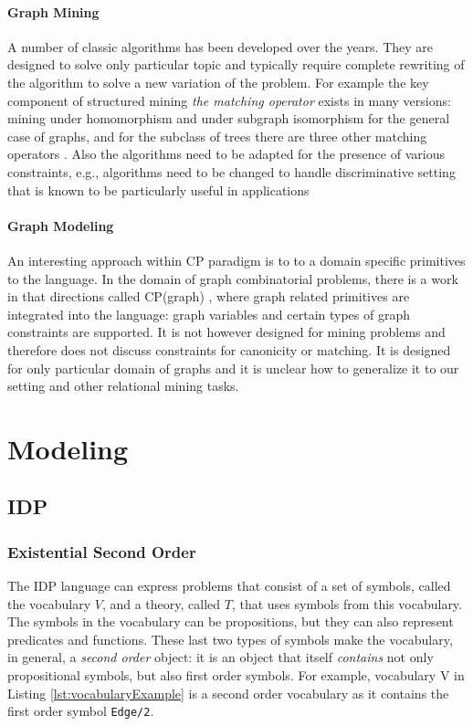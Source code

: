 \documentclass{article}
\theoremstyle{definition}
\begin{document}
\paragraph{Graph Mining} A number of classic algorithms has been developed over the years. They are designed to solve only particular topic and typically require complete rewriting of the algorithm to solve a new variation of the problem. For example the key component of structured mining \textit{the matching operator} exists in many versions: mining under homomorphism \citep{theta_subsumption} and under subgraph isomorphism \citep{gspan} for the general case of graphs, and for the subclass of trees there are three other matching operators \citep{subtree_overview}. Also the algorithms need to be adapted for the presence of various constraints, e.g., algorithms need to be changed to handle discriminative setting that is known to be particularly useful in applications \citep{pattern_mining_classification}

\paragraph{Graph Modeling} An interesting approach within CP paradigm is to to a domain specific primitives to the language. In the domain of graph combinatorial problems, there is a work in that directions called CP(graph) \citep{cp_graph}, where graph related primitives are integrated into the language: graph variables and certain types of graph constraints are supported. It is not however designed for mining problems and therefore does not discuss constraints for canonicity or matching. It is designed for only particular domain of graphs and it is unclear how to generalize it to our setting and other relational mining tasks.


\section{Modeling}
\subsection{IDP}
\subsubsection{Existential Second Order}
The IDP language can express problems that consist of a set of symbols, called the vocabulary $V$, and a theory, called $T$, that uses symbols from this vocabulary.
The symbols in the vocabulary can be propositions, but they can also represent predicates and functions.
These last two types of symbols make the vocabulary, in general, a \emph{second order} object: it is an object that itself \emph{contains} not only propositional symbols, but also first order symbols.
For example, vocabulary V in Listing \ref{lst:vocabularyExample} is a second order vocabulary as it contains the first order symbol \lstinline{Edge/2}.
\end{document}
